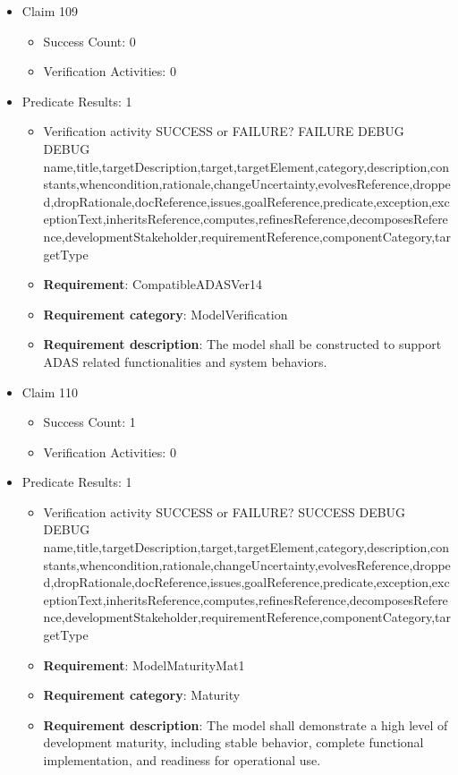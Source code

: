 \documentclass{article}
\begin{document}
\begin{itemize}
  				  \item Claim 109
				\begin{itemize}
			    	\item Success Count: 0 
			    	\item Verification Activities: 0
				\end{itemize}
				
									    
				\item Predicate Results: 1
					\begin{itemize}				
					\item Verification activity SUCCESS or FAILURE? FAILURE
					DEBUG DEBUG name,title,targetDescription,target,targetElement,category,description,constants,whencondition,rationale,changeUncertainty,evolvesReference,dropped,dropRationale,docReference,issues,goalReference,predicate,exception,exceptionText,inheritsReference,computes,refinesReference,decomposesReference,developmentStakeholder,requirementReference,componentCategory,targetType
					\item \textbf{Requirement}: CompatibleADASVer14 
					\item \textbf{Requirement category}: ModelVerification
					\item \textbf{Requirement description}: The model shall be constructed to support ADAS related functionalities and system behaviors.
					\end{itemize}

  				  \item Claim 110
				\begin{itemize}
			    	\item Success Count: 1 
			    	\item Verification Activities: 0
				\end{itemize}
				
									    
				\item Predicate Results: 1
					\begin{itemize}				
					\item Verification activity SUCCESS or FAILURE? SUCCESS
					DEBUG DEBUG name,title,targetDescription,target,targetElement,category,description,constants,whencondition,rationale,changeUncertainty,evolvesReference,dropped,dropRationale,docReference,issues,goalReference,predicate,exception,exceptionText,inheritsReference,computes,refinesReference,decomposesReference,developmentStakeholder,requirementReference,componentCategory,targetType
					\item \textbf{Requirement}: ModelMaturityMat1 
					\item \textbf{Requirement category}: Maturity
					\item \textbf{Requirement description}: The model shall demonstrate a high level of development maturity, including stable behavior, complete functional implementation, and readiness for operational use.
					\end{itemize}


\end{itemize}
\end{document}
